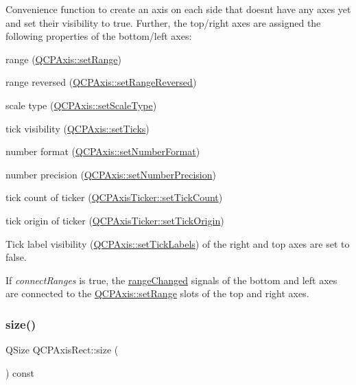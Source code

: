 Convenience function to create an axis on each side that doesn\textquotesingle{}t have any axes yet and set their visibility to true. Further, the top/right axes are assigned the following properties of the bottom/left axes\+:

\begin{DoxyItemize}
\item range (\hyperlink{classQCPAxis_aebdfea5d44c3a0ad2b4700cd4d25b641}{Q\+C\+P\+Axis\+::set\+Range}) \item range reversed (\hyperlink{classQCPAxis_a2172fdb196b1a0dc3f40992fcad8e9e1}{Q\+C\+P\+Axis\+::set\+Range\+Reversed}) \item scale type (\hyperlink{classQCPAxis_adef29cae617af4f519f6c40d1a866ca6}{Q\+C\+P\+Axis\+::set\+Scale\+Type}) \item tick visibility (\hyperlink{classQCPAxis_ac891409315bc379e3b1abdb162c1a011}{Q\+C\+P\+Axis\+::set\+Ticks}) \item number format (\hyperlink{classQCPAxis_ae585a54dc2aac662e90a2ca82f002590}{Q\+C\+P\+Axis\+::set\+Number\+Format}) \item number precision (\hyperlink{classQCPAxis_a21dc8023ad7500382ad9574b48137e63}{Q\+C\+P\+Axis\+::set\+Number\+Precision}) \item tick count of ticker (\hyperlink{classQCPAxisTicker_a47752abba8293e6dc18491501ae34008}{Q\+C\+P\+Axis\+Ticker\+::set\+Tick\+Count}) \item tick origin of ticker (\hyperlink{classQCPAxisTicker_ab509c7e500293bf66a8409f0d7c23943}{Q\+C\+P\+Axis\+Ticker\+::set\+Tick\+Origin})\end{DoxyItemize}
Tick label visibility (\hyperlink{classQCPAxis_a04ba16e1f6f78d70f938519576ed32c8}{Q\+C\+P\+Axis\+::set\+Tick\+Labels}) of the right and top axes are set to false.

If {\itshape connect\+Ranges} is true, the \hyperlink{classQCPAxis_a0894084e4c16a1736534c4095746f910}{range\+Changed} signals of the bottom and left axes are connected to the \hyperlink{classQCPAxis_aebdfea5d44c3a0ad2b4700cd4d25b641}{Q\+C\+P\+Axis\+::set\+Range} slots of the top and right axes. \mbox{\label{classQCPAxisRect_a7a8289346eb612f422c704f8b75cf479}} 
\subsubsection{\texorpdfstring{size()}{size()}}
{\footnotesize\ttfamily Q\+Size Q\+C\+P\+Axis\+Rect\+::size (\begin{DoxyParamCaption}{ }\end{DoxyParamCaption}) const\hspace{0.3cm}{\ttfamily [inline]}}

